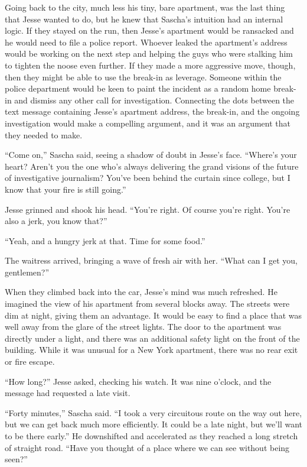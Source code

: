 \documentclass[12pt]{book}
\begin{document}
Going back to the city, much less his tiny, bare apartment, was the last thing that Jesse wanted to do, but he knew that Sascha's intuition had an internal logic.  If they stayed on the run, then Jesse's apartment would be ransacked and he would need to file a police report.  Whoever leaked the apartment's address would be working on the next step and helping the guys who were stalking him to tighten the noose even further.  If they made a more aggressive move, though, then they might be able to use the break-in as leverage.  Someone within the police department would be keen to paint the incident as a random home break-in and dismiss any other call for investigation.  Connecting the dots between the text message containing Jesse's apartment address, the break-in, and the ongoing investigation would make a compelling argument, and it was an argument that they needed to make.

``Come on,'' Sascha said, seeing a shadow of doubt in Jesse's face.  ``Where's your heart?  Aren't you the one who's always delivering the grand visions of the future of investigative journalism?  You've been behind the curtain since college, but I know that your fire is still going.''

Jesse grinned and shook his head.  ``You're right.  Of course you're right.  You're also a jerk, you know that?''

``Yeah, and a hungry jerk at that.  Time for some food.''

The waitress arrived, bringing a wave of fresh air with her.  ``What can I get you, gentlemen?''


When they climbed back into the car, Jesse's mind was much refreshed.  He imagined the view of his apartment from several blocks away.  The streets were dim at night, giving them an advantage.  It would be easy to find a place that was well away from the glare of the street lights.  The door to the apartment was directly under a light, and there was an additional safety light on the front of the building.  While it was unusual for a New York apartment, there was no rear exit or fire escape.

``How long?'' Jesse asked, checking his watch.  It was nine o'clock, and the message had requested a late visit.

``Forty minutes,'' Sascha said.  ``I took a very circuitous route on the way out here, but we can get back much more efficiently.  It could be a late night, but we'll want to be there early.''  He downshifted and accelerated as they reached a long stretch of straight road.  ``Have you thought of a place where we can see without being seen?''
\end{document}
